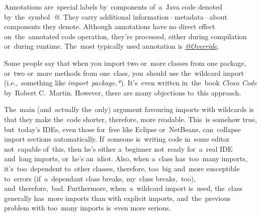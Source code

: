 
\label{javaabstractclasses}

\label{javainterfaces}

\label{javaannotation}
Annotations are~special labels by~components of~a~Java code denoted by~the~symbol~\textquotesingle\textit{@}\textquotesingle.
They carry additional information\,--\,metadata\,--\,about components they denote.
Although annotations have no direct effect on~the~annotated code operation, they're processed, either during compilation or~during runtime.
The~most typically used annotation is \hyperref[javaoverride]{\textit{@Override}}.

\label{annotationsrepeatable}

\label{javagenerics}

\label{javathread}

\label{javathreadsafety}


\label{reflection}

Some people say that when you import two or~more classes from one package, or~two or~more methods from one~class, you~should use the~wildcard import (i.e.,~something like \textit{import~package.*}).
It's~even written in~the~book \textit{Clean Code} by~Robert C.~Martin.
However, there are many objections to~this approach.

The~main (and~actually the~only) argument favouring imports with wildcards is that they make the~code shorter, therefore, more readable.
This~is somehow true, but~today's IDEs, even those for~free like Eclipse or~NetBeans, can~collapse import sections automatically.
If~someone is~writing code in~some editor not~capable of~this, then he's either a~beginner not~ready for~a~real IDE and~long imports, or~he's an~idiot.
Also, when a~class has~too~many imports, it's~too~dependent to~other classes, therefore, too~big and~more susceptible to~errors (if~a~dependant class breaks, my~class breaks,~too), and~therefore,~bad.
Furthermore, when~a~wildcard import is~used, the~class generally has~more imports than with explicit imports, and~the~previous problem with too~many imports is~even more serious.

